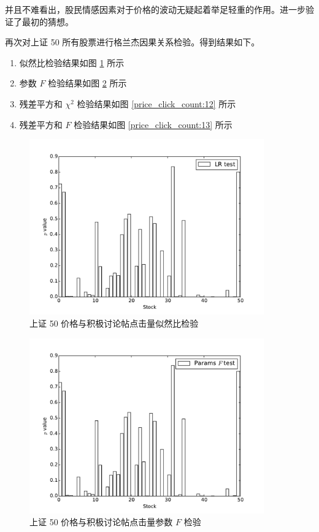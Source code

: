 并且不难看出，股民情感因素对于价格的波动无疑起着举足轻重的作用。进一步验证了最初的猜想。

再次对上证 50 所有股票进行格兰杰因果关系检验。得到结果如下。

\begin{enumerate}
  \item 似然比检验结果如图 \ref{price_click_count:10} 所示
  \item 参数 $F$ 检验结果如图 \ref{price_click_count:11} 所示
  \item 残差平方和 $\chi^{2}$ 检验结果如图 \ref{price_click_count:12} 所示
  \item 残差平方和 $F$ 检验结果如图 \ref{price_click_count:13} 所示
\end{enumerate}

\begin{figure}
  \centering
  \includegraphics[width=0.9\textwidth]{plots/price_click_count_positive_granger_on_sse_50_lrtest.pdf}
  \caption{上证 50 价格与积极讨论帖点击量似然比检验}
  \label{price_click_count:10}
\end{figure}

\begin{figure}
  \centering
  \includegraphics[width=0.9\textwidth]{plots/price_click_count_positive_granger_on_sse_50_params_ftest.pdf}
  \caption{上证 50 价格与积极讨论帖点击量参数 $F$ 检验}
  \label{price_click_count:11}
\end{figure}


